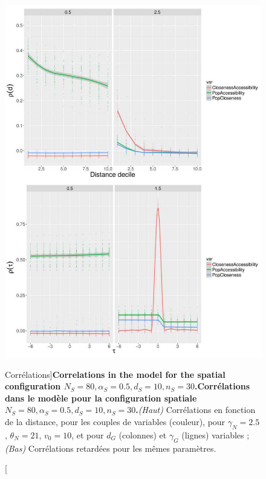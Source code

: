 \begin{figure}
\includegraphics[width=\linewidth,height=0.9\textheight]{Figures/Final/6-1-3-fig-macrocoevolexplo-correlations.jpg}
	\caption[Correlations][Corrélations]{\textbf{Correlations in the model for the spatial configuration $N_S=80,\alpha_S=0.5,d_S=10,n_S=30$.}\label{fig:macrocoevolexplo:correlations}}{\textbf{Corrélations dans le modèle pour la configuration spatiale $N_S=80,\alpha_S=0.5,d_S=10,n_S=30$.}\textit{(Haut)} Corrélations en fonction de la distance, pour les couples de variables (couleur), pour $\gamma_N = 2.5$, $\theta_N = 21$, $v_0 = 10$, et pour $d_G$ (colonnes) et $\gamma_G$ (lignes) variables ; \textit{(Bas)} Corrélations retardées pour les mêmes paramètres.\label{fig:macrocoevolexplo:correlations}}
\end{figure}



